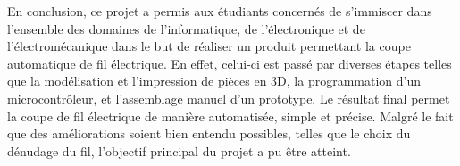 En conclusion, ce projet a permis aux étudiants concernés de s'immiscer dans l'ensemble des domaines de l'informatique, de l'électronique et de l'électromécanique dans le but de réaliser un produit permettant la coupe automatique de fil électrique. En effet, celui-ci est passé par diverses étapes telles que la modélisation et l'impression de pièces en 3D, la programmation d'un microcontrôleur, et l'assemblage manuel d'un prototype. Le résultat final permet la coupe de fil électrique de manière automatisée, simple et précise. Malgré le fait que des améliorations soient bien entendu possibles, telles que le choix du dénudage du fil, l'objectif principal du projet a pu être atteint.